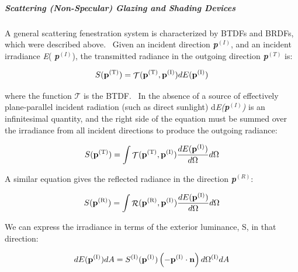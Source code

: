 \subparagraph{\textbf{Scattering (Non-Specular) Glazing and Shading Devices}}\label{scattering-non-specular-glazing-and-shading-devices}

A general scattering fenestration system is characterized by BTDFs and BRDFs, which were described above.~ Given an incident direction \textbf{\emph{p}}\(^{(I)}\), and an incident irradiance \emph{E}( \textbf{\emph{p}}\(^{(I)}\)), the transmitted radiance in the outgoing direction \textbf{\emph{p}}\(^{(T)}\) is:

\begin{equation}
S({{\bf{p}}^{{\rm{(T)}}}}) = {\mathop{\rm \mathcal{T}}\nolimits} ({{\bf{p}}^{{\rm{(T)}}}},{{\bf{p}}^{{\rm{(I)}}}})dE({{\bf{p}}^{{\rm{(I)}}}})
\label{eq:SofptotheTDiffEq}
\end{equation}

where the function $\mathcal{T}$ is the BTDF.~ In the absence of a source of effectively plane-parallel incident radiation (such as direct sunlight) d\emph{E(\textbf{p}}\(^{(I)}\)\emph{)} is an infinitesimal quantity, and the right side of the equation must be summed over the irradiance from all incident directions to produce the outgoing radiance:

\begin{equation}
S({{\bf{p}}^{{\rm{(T)}}}}) = \int {{\mathop{\rm \mathcal{T}}\nolimits} ({{\bf{p}}^{{\rm{(T)}}}},{{\bf{p}}^{{\rm{(I)}}}})\frac{{dE({{\bf{p}}^{{\rm{(I)}}}})}}{{d\Omega }}d\Omega }
\label{eq:SofptotheTIntegral}
\end{equation}

A similar equation gives the reflected radiance in the direction \textbf{\emph{p}}\(^{(R)}\):

\begin{equation}
S({{\bf{p}}^{{\rm{(R)}}}}) = \int {{\mathop{\rm \mathcal{R}}\nolimits} ({{\bf{p}}^{{\rm{(R)}}}},{{\bf{p}}^{{\rm{(I)}}}})\frac{{dE({{\bf{p}}^{{\rm{(I)}}}})}}{{d\Omega }}d\Omega }
\label{eq:SofptotheREquation}
\end{equation}

We can express the irradiance in terms of the exterior luminance, S, in that direction:

\begin{equation}
dE({{\bf{p}}^{{\rm{(I)}}}})dA = {S^{{\rm{(I)}}}}({{\bf{p}}^{{\rm{(I)}}}})\left( { - {{\bf{p}}^{{\rm{(I)}}}}\cdot {\bf{n}}} \right)d{\Omega ^{{\rm{(I)}}}}dA
\label{eq:dEpIdAEquation}
\end{equation}

